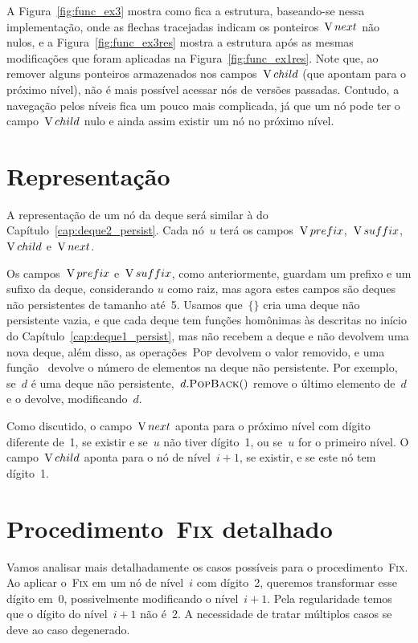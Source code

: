\documentclass[main.tex]{subfiles}
\begin{document}
A Figura~\ref{fig:func_ex3} mostra como fica a estrutura, baseando-se nessa implementação, onde as flechas tracejadas indicam os ponteiros~$\operatorname{V}{next}$ não nulos, e a Figura~\ref{fig:func_ex3res} mostra a estrutura após as mesmas modificações que foram aplicadas na Figura~\ref{fig:func_ex1res}. Note que, ao remover alguns ponteiros armazenados nos campos~$\operatorname{V}{child}$ (que apontam para o próximo nível), não é mais possível acessar nós de versões passadas. Contudo, a navegação pelos níveis fica um pouco mais complicada, já que um nó pode ter o campo~$\operatorname{V}{child}$ nulo e ainda assim existir um nó no próximo nível.

\section{Representação}

A representação de um nó da deque será similar à do Capítulo~\ref{cap:deque2_persist}. Cada nó~$u$ terá os campos~$\operatorname{V}{prefix}$,~$\operatorname{V}{suffix}$,~$\operatorname{V}{child}$ e~$\operatorname{V}{next}$.

Os campos~$\operatorname{V}{prefix}$ e~$\operatorname{V}{suffix}$, como anteriormente, guardam um prefixo e um sufixo da deque, considerando $u$ como raiz, mas agora estes campos são deques não persistentes de tamanho até~5. Usamos que~$\{\}$ cria uma deque não persistente vazia, e que cada deque tem funções homônimas às descritas no início do Capítulo~\ref{cap:deque1_persist}, mas não recebem a deque e não devolvem uma nova deque, além disso, as operações~\textsc{Pop} devolvem o valor removido, e uma função~ devolve o número de elementos na deque não persistente. Por exemplo, se~$d$ é uma deque não persistente,~$d.\mbox{\textsc{PopBack}\ensuremath{()}}$ remove o último elemento de~$d$ e o devolve, modificando~$d$.

Como discutido, o campo~$\operatorname{V}{next}$ aponta para o próximo nível com dígito diferente de~1, se existir e se~$u$ não tiver dígito~1, ou se~$u$ for o primeiro nível. O campo~$\operatorname{V}{child}$ aponta para o nó de nível~$i + 1$, se existir, e se este nó tem dígito~1.

\section{Procedimento~{\normalfont \textsc{Fix}} detalhado} \label{sec:fix_det}

Vamos analisar mais detalhadamente os casos possíveis para o procedimento~\textsc{Fix}. Ao aplicar o~\textsc{Fix} em um nó de nível~$i$ com dígito~2, queremos transformar esse dígito em~0, possivelmente modificando o nível~$i+1$. Pela regularidade temos que o dígito do nível~$i+1$ não é~2. A necessidade de tratar múltiplos casos se deve ao caso degenerado.
\end{document}
